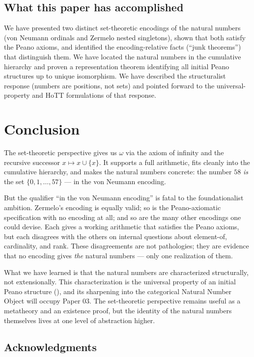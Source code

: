 \documentclass[12pt]{article}
\theoremstyle{definition}
\theoremstyle{remark}
\begin{document}
\subsection{What this paper has accomplished}

We have presented two distinct set-theoretic encodings of the natural
numbers (von Neumann ordinals and Zermelo nested singletons), shown that
both satisfy the Peano axioms, and identified the encoding-relative facts
(``junk theorems'') that distinguish them. We have located the natural
numbers in the cumulative hierarchy and proven a representation theorem
identifying all initial Peano structures up to unique isomorphism. We have
described the structuralist response (numbers are positions, not sets)
and pointed forward to the universal-property and HoTT formulations of
that response.

\section{Conclusion}
\label{sec:conclusion}

The set-theoretic perspective gives us $\omega$ via the axiom of infinity
and the recursive successor $x \mapsto x \cup \{x\}$. It supports a full
arithmetic, fits cleanly into the cumulative hierarchy, and makes the
natural numbers concrete: the number $58$ \emph{is} the set $\{0,1,\ldots,57\}$
--- in the von Neumann encoding.

But the qualifier ``in the von Neumann encoding'' is fatal to the
foundationalist ambition. Zermelo's encoding is equally valid; so is the
Peano-axiomatic specification with no encoding at all; and so are the
many other encodings one could devise. Each gives a working arithmetic
that satisfies the Peano axioms, but each disagrees with the others on
internal questions about element-of, cardinality, and rank. These
disagreements are not pathologies; they are evidence that no encoding
gives \emph{the} natural numbers --- only one realization of them.

What we have learned is that the natural numbers are characterized
structurally, not extensionally. This characterization is the universal
property of an initial Peano structure (), and its
sharpening into the categorical Natural Number Object will occupy
Paper 03. The set-theoretic perspective remains useful as a metatheory
and an existence proof, but the identity of the natural numbers
themselves lives at one level of abstraction higher.

\subsection*{Acknowledgments}
\end{document}
